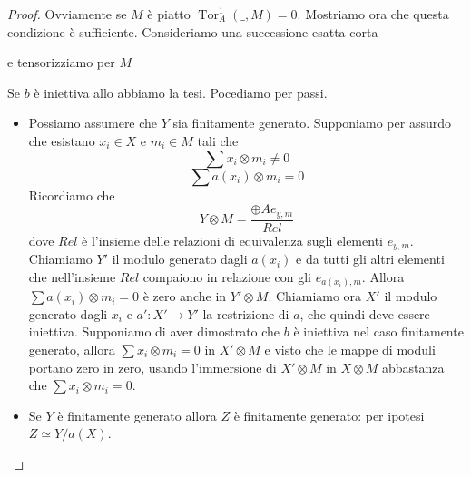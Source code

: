 \documentclass[a4paper,11pt,oneside]{book}
\DeclareMathOperator{\Tor}{Tor}
\theoremstyle{definition}
\begin{document}
   \begin{proof}
    Ovviamente se $M$ è piatto $\Tor_A^1 ( \_, M )=0$. Mostriamo ora che questa condizione è sufficiente.
    Consideriamo una successione esatta corta
    \begin{center}
      \end{center}
      e tensorizziamo per $M$
    \begin{center}
      \end{center}
      Se $b$ è iniettiva allo abbiamo la tesi.
    Pocediamo per passi.
    \begin{itemize}
     \item Possiamo assumere che $Y$ sia finitamente generato. Supponiamo per assurdo che esistano $x_i\in X$ e $m_i\in M$ tali che
	\[
	 \sum x_i\otimes m_i\neq 0 
	\]
	\[
	 \sum a(x_i)\otimes m_i= 0 
	\]
	Ricordiamo che 
	\[
	Y\otimes M= \frac{ \oplus Ae_{y,m}}{Rel}
	\]
	dove $Rel$ è l'insieme delle relazioni di equivalenza sugli elementi $e_{y,m}$. Chiamiamo $Y'$ il modulo generato dagli
	$a(x_i)$ e da tutti gli altri elementi che nell'insieme $Rel$ compaiono in relazione con gli $e_{a(x_i),m}$.
	Allora $\sum a(x_i)\otimes m_i= 0$ è zero anche in $Y'\otimes M$. 
	Chiamiamo ora $X'$ il modulo generato dagli $x_i$ e $a'\colon X'\rightarrow Y'$ la restrizione di $a$, che quindi deve essere
	iniettiva. Supponiamo di aver dimostrato che $b$ è iniettiva nel caso finitamente generato,
	allora  $\sum x_i\otimes m_i =0 $ in $X'\otimes M$ e visto che le mappe di moduli portano zero in zero, usando l'immersione
	di $X'\otimes M$ in $X\otimes M$ abbastanza che $\sum x_i\otimes m_i =0 $.
	\item Se $Y$ è finitamente generato allora $Z$ è finitamente generato: per ipotesi $Z\simeq Y/a(X)$.

\end{itemize}
\end{proof}
\end{document}

